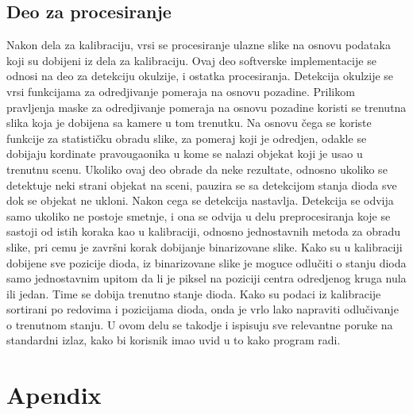 \documentclass[a4paper,12pt, projekat]{etf}
\begin{document}
        \section{Deo za procesiranje}
        Nakon dela za kalibraciju, vrsi se procesiranje ulazne slike na osnovu
        podataka koji su dobijeni iz dela za kalibraciju. Ovaj deo softverske
        implementacije se odnosi na deo za detekciju okulzije, i ostatka
        procesiranja. Detekcija okulzije se vrsi funkcijama za odredjivanje
        pomeraja na osnovu pozadine. Prilikom pravljenja maske za odredjivanje
        pomeraja na osnovu pozadine koristi se trenutna slika koja je dobijena
        sa kamere u tom trenutku. Na osnovu \v{c}ega se koriste funkcije za
        statisti\v{c}ku obradu slike, za pomeraj koji je odredjen, odakle se
        dobijaju kordinate pravougaonika u kome se nalazi objekat koji je usao
        u trenutnu scenu. Ukoliko ovaj deo obrade da neke rezultate, odnosno
        ukoliko se detektuje neki strani objekat na sceni, pauzira se sa
        detekcijom stanja dioda sve dok se objekat ne ukloni. Nakon cega se
        detekcija nastavlja. Detekcija se odvija samo ukoliko ne postoje
        smetnje, i ona se odvija u delu preprocesiranja koje se sastoji od
        istih koraka kao u kalibraciji, odnosno jednostavnih metoda za obradu
        slike, pri cemu je zavr\v{s}ni korak dobijanje binarizovane slike. Kako su u
        kalibraciji dobijene sve pozicije dioda, iz binarizovane slike je
        moguce odlu\v{c}iti o stanju dioda samo jednostavnim upitom da li je piksel
        na poziciji centra odredjenog kruga nula ili jedan. Time se dobija
        trenutno stanje dioda. Kako su podaci iz kalibracije sortirani po
        redovima i pozicijama dioda, onda je vrlo lako napraviti odlu\v{c}ivanje o
        trenutnom stanju. U ovom delu se takodje i ispisuju sve relevantne
        poruke na standardni izlaz, kako bi korisnik imao uvid u to kako
        program radi.

        \chapter{Apendix}
\end{document}
